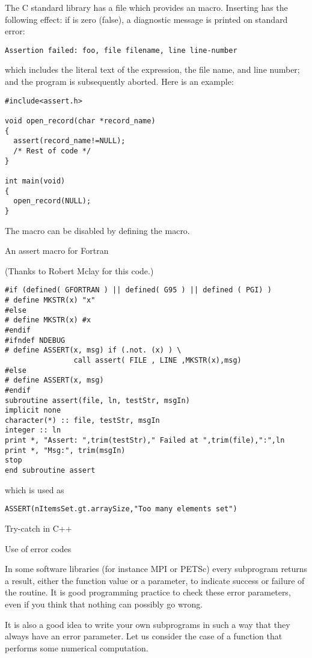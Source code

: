 The C standard library has a file  which provides an
 macro. Inserting  has the following
effect: if  is zero (false), a diagnostic message is printed
on standard error:
\begin{verbatim}
Assertion failed: foo, file filename, line line-number
\end{verbatim}
which includes the literal text of the expression, 
the file name, and line number; and the program is subsequently
aborted. Here is an example:
\begin{verbatim}
#include<assert.h>

void open_record(char *record_name)
{
  assert(record_name!=NULL);
  /* Rest of code */
}

int main(void)
{
  open_record(NULL);
}
\end{verbatim}
The  macro can be disabled by defining the
 macro.

 {An assert macro for Fortran}

(Thanks to Robert Mclay for this code.)

\begin{verbatim}
#if (defined( GFORTRAN ) || defined( G95 ) || defined ( PGI) )
# define MKSTR(x) "x"
#else
# define MKSTR(x) #x
#endif
#ifndef NDEBUG
# define ASSERT(x, msg) if (.not. (x) ) \
                call assert( FILE , LINE ,MKSTR(x),msg)
#else
# define ASSERT(x, msg)
#endif
subroutine assert(file, ln, testStr, msgIn)
implicit none
character(*) :: file, testStr, msgIn
integer :: ln
print *, "Assert: ",trim(testStr)," Failed at ",trim(file),":",ln
print *, "Msg:", trim(msgIn)
stop
end subroutine assert
\end{verbatim}
which is used as
\begin{verbatim}
ASSERT(nItemsSet.gt.arraySize,"Too many elements set")
\end{verbatim}

\begin{notready}
 {Try-catch in C++}
\end{notready}

 {Use of error codes}

In some software libraries (for instance MPI or PETSc) every subprogram
returns a result, either the function value or a parameter, to
indicate success or failure of the routine. It is good programming
practice to check these error parameters, even if you think that
nothing can possibly go wrong.

It is also a good idea to write your own subprograms in such a way
that they always have an error parameter. Let us consider the case of
a function that performs some numerical computation.

